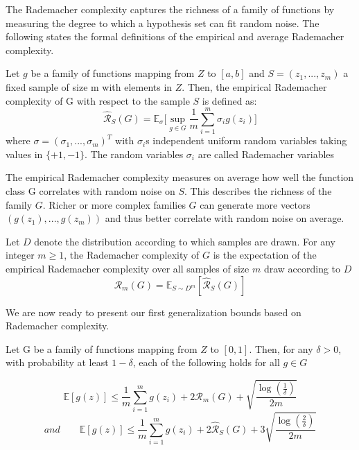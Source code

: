 The Rademacher complexity captures the richness of a family of functions by
measuring the degree to which a hypothesis set can fit random noise. The following
states the formal definitions of the empirical and average Rademacher complexity.
\begin{definition}
	Let $g$ be a family of functions mapping from $Z$ to $[a,b]$ and $S=(z_1,...,z_m)$ a fixed
	sample of size m with elements in $Z$. Then, the empirical Rademacher complexity
	of G with respect to the sample $S$ is defined as:
	\begin{equation}
	\hat{\mathcal{R}}_S(G)= \mathbb{E}_{\sigma} \big[\sup_{g\in G}\frac{1}{m}\sum_{i=1}^{m}\sigma_ig(z_i)\big]
	\end{equation}
	where $\sigma=(\sigma_1,...,\sigma_m)^T$ with $\sigma_i$s independent uniform random variables taking values in $\{+1,-1\}$. The random variables $\sigma_i$ are called Rademacher variables
\end{definition}
The empirical Rademacher complexity measures on average how well the function class G correlates with random noise on $S$. This describes the richness of the family $G$. Richer or more complex families $G$ can generate more vectors $(g(z_1),...,g(z_m))$ and thus better correlate with random noise on average.
\begin{definition}
	Let $D$ denote the distribution according to which samples are drawn. For any
	integer $m \geq 1$, the Rademacher complexity of $G$ is the expectation of the empirical
	Rademacher complexity over all samples of size $m$ draw according to $D$
	\begin{equation}
	\mathcal{R}_m(G)= \mathbb{E}_{S\sim D^m}[\hat{\mathcal{R}}_S(G)]
	\end{equation}
\end{definition}
We are now ready to present our first generalization bounds based on Rademacher complexity.
\begin{theorem}
	Let G be a family of functions mapping from $Z$ to $[0,1]$. Then, for any $\delta>0$, with
	probability at least $1-\delta$, each of the following holds for all $g\in G$
\end{theorem}
\begin{equation}
\mathbb{E}[g(z)] \leq \frac{1}{m}\sum_{i=1}^{m}g(z_i) +2\mathcal{R}_m(G) +\sqrt{\frac{\log(\frac{1}{\delta})}{2m}}
\end{equation}
\begin{equation}
and \qquad	\mathbb{E}[g(z)] \leq \frac{1}{m}\sum_{i=1}^{m}g(z_i) +2\hat{\mathcal{R}}_S(G) +3\sqrt{\frac{\log(\frac{2}{\delta})}{2m}}
\end{equation}
